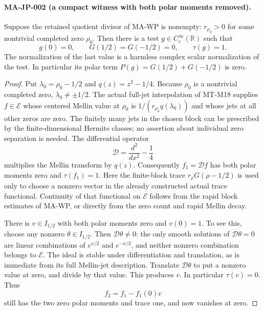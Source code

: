 \paragraph{MA-JP-002 (a compact witness with both polar moments removed).}
Suppose the retained quotient divisor of MA-WP is nonempty:
$r_{\rho_0}>0$ for some nontrivial completed zero $\rho_0$.
Then there is a test $g\in C_c^\infty(\mathbb R)$ such that
\[
        g(0)=0,\qquad G(1/2)=G(-1/2)=0,\qquad \tau(g)=1 .
 \tag{MA-JP.5}
\]
The normalization of the last value is a harmless complex
scalar normalization of the test.  In particular its polar
term $P(g)=G(1/2)+G(-1/2)$ is zero.

\begin{proof}
Put $\lambda_0=\rho_0-1/2$ and
$q(z)=z^2-1/4$.  Because $\rho_0$ is a nontrivial completed
zero, $\lambda_0\ne\pm1/2$.
The actual full-jet interpolation of MT-M18 supplies
$f\in\mathcal E$ whose centered Mellin value at $\rho_0$
is $1/(r_{\rho_0}q(\lambda_0))$ and whose jets at all
other zeros are zero.  The finitely many jets in the
chosen block can be prescribed by the finite-dimensional
Hermite classes; no assertion about individual zero
separation is needed.
The differential operator
\[
                     \mathcal D=\frac{d^2}{dx^2}-\frac14
 \tag{MA-JP.6}
\]
multiplies the Mellin transform by $q(z)$.
Consequently $f_1=\mathcal D f$ has both polar moments
zero and $\tau(f_1)=1$.  Here the finite-block trace
$r_\rho G(\rho-1/2)$ is used only to choose a nonzero
vector in the already constructed actual trace functional.
Continuity of that functional on $\mathcal E$ follows
from the rapid block estimates of MA-WP, or directly
from the zero count and rapid Mellin decay.

There is $v\in I_{1/2}$ with both polar moments zero and
$v(0)=1$.  To see this, choose any nonzero
$\theta\in I_{1/2}$.  Then $\mathcal D\theta\ne0$:
the only smooth solutions of $\mathcal D\theta=0$
are linear combinations of $e^{x/2}$ and $e^{-x/2}$,
and neither nonzero combination belongs to $\mathcal E$.
The ideal is stable under differentiation and translation,
as is immediate from its full Mellin-jet description.
Translate $\mathcal D\theta$ to put a nonzero value at
zero, and divide by that value.
This produces $v$.  In particular $\tau(v)=0$.
Thus
\[
                        f_2=f_1-f_1(0)v
 \tag{MA-JP.7}
\]
still has the two zero polar moments and trace one,
and now vanishes at zero.


\end{proof}
